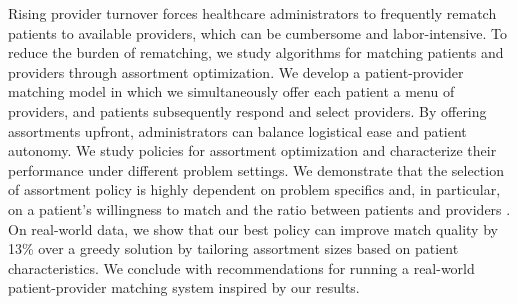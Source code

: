 Rising provider turnover forces healthcare administrators to frequently rematch patients to available providers, which can be cumbersome and labor-intensive.
To reduce the burden of rematching, we study algorithms for matching patients and providers through assortment optimization.
We develop a patient-provider matching model in which we simultaneously offer each patient a menu of providers, and patients subsequently respond and select providers. 
By offering assortments upfront, administrators can balance logistical ease and patient autonomy. 
We study policies for assortment optimization and characterize their performance under different problem settings. 
We demonstrate that the selection of assortment policy is highly dependent on problem specifics and, in particular, on a patient's willingness to match and the ratio between patients and providers .
On real-world data, we show that our best policy can improve match quality by 13\% over a greedy solution by tailoring assortment sizes based on patient characteristics.
We conclude with recommendations for running a real-world patient-provider matching system inspired by our results. 